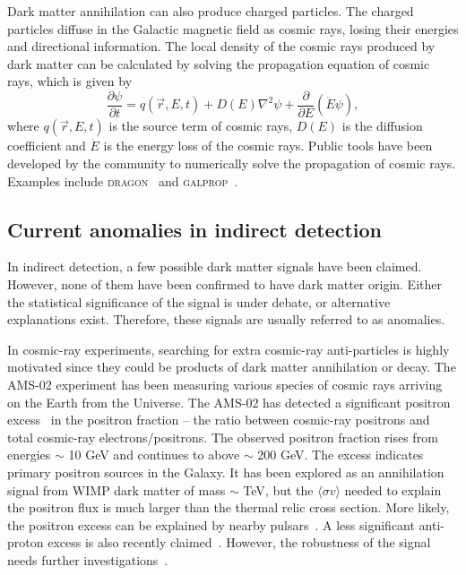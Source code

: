 \documentclass[doublespace,nopageskip]{VTthesis}
\newcommand{\sigmav}{\langle\sigma v\rangle}
\begin{document}
Dark matter annihilation can also produce charged particles. The charged particles diffuse in the Galactic magnetic field as cosmic rays, losing their energies and directional information. The local density of the cosmic rays produced by dark matter can be calculated by solving the propagation equation of cosmic rays, which is given by
\begin{equation}
    \frac{\partial\psi}{\partial t} = q(\vec{r},E,t) + D(E)\nabla^2\psi + \frac{\partial}{\partial E}(\dot{E}\psi),
\end{equation}
where $q(\vec{r},E,t)$ is the source term of cosmic rays, $D(E)$ is the diffusion coefficient and $\dot{E}$ is the energy loss of the cosmic rays. Public tools have been developed by the community to numerically solve the propagation of cosmic rays. Examples include \textsc{dragon}~\cite{2010APh....34..274D} and \textsc{galprop}~\cite{1998ApJ...509..212S}.

\subsection{Current anomalies in indirect detection}

{In indirect detection, a few possible dark matter signals have been claimed. However, none of them have been confirmed to have dark matter origin. Either the statistical significance of the signal is under debate, or alternative explanations exist. Therefore, these signals are usually referred to as anomalies.}


{In cosmic-ray experiments, searching for extra cosmic-ray anti-particles is highly motivated since they could be products of dark matter annihilation or decay.} The AMS-02 experiment has been measuring various species of cosmic rays arriving on the Earth from the Universe. The AMS-02 has detected a significant positron excess~\cite{2014PhRvL.113l1101A} {in the positron fraction -- the ratio between cosmic-ray positrons and total cosmic-ray electrons/positrons. The observed positron fraction rises from energies $\sim$ 10 GeV and continues to above $\sim$ 200 GeV. The excess indicates primary positron sources in the Galaxy.} It has been explored as an annihilation signal from WIMP dark matter of mass $\sim$ TeV, but the $\sigmav$ needed to explain the positron flux is much larger than the thermal relic cross section. More likely, the positron excess can be explained by nearby pulsars~\cite{2009JCAP...01..025H}. A less significant anti-proton excess is also recently claimed~\cite{2017PhRvL.118s1101C}. However, the robustness of the signal needs further investigations~\cite{2019PhRvD..99j3026C, 2021arXiv210714606H}.
\end{document}
